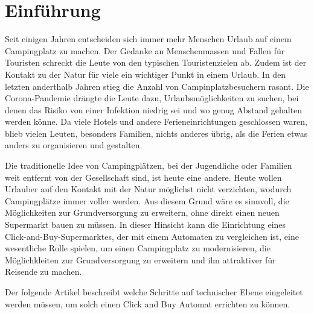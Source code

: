 \section{Einführung}



Seit einigen Jahren entscheiden sich immer mehr Menschen Urlaub auf einem Campingplatz zu machen. Der Gedanke an 
Menschenmassen und Fallen für Touristen schreckt die Leute von den typischen Touristenzielen ab. 
Zudem ist der Kontakt zu der Natur für viele ein wichtiger Punkt in einem Urlaub. In den letzten anderthalb Jahren stieg die Anzahl 
von Campinplatzbesuchern rasant. Die Corona-Pandemie drängte die Leute dazu, Urlaubsmöglichkeiten zu suchen, bei denen das Risiko
von einer Infektion niedrig sei und wo genug Abstand gehalten werden könne. Da viele Hotels und andere Ferieneinrichtungen
geschlossen waren, blieb vielen Leuten, besonders Familien, nichts anderes übrig, als die Ferien etwas anders zu 
organisieren und gestalten.

Die traditionelle Idee von Campingplätzen, bei der Jugendliche oder Familien weit entfernt von der Gesellschaft sind, 
ist heute eine andere. Heute wollen Urlauber auf den Kontakt mit der Natur möglichst nicht verzichten, wodurch Campingplätze immer voller werden.
Aus diesem Grund wäre es sinnvoll, die Möglichkeiten zur Grundversorgung zu erweitern, ohne direkt einen neuen Supermarkt bauen zu müssen.
In dieser Hinsicht kann die Einrichtung eines Click-and-Buy-Supermarktes, der mit einem
Automaten zu vergleichen ist, eine wesentliche Rolle spielen, um einen Campingplatz zu modernisieren, die Möglichkleiten 
zur Grundversorgung zu erweitern und ihn attraktiver für Reisende zu machen.

Der folgende Artikel beschreibt welche Schritte auf technischer Ebene eingeleitet werden müssen, um solch einen 
Click and Buy Automat errichten zu können. 